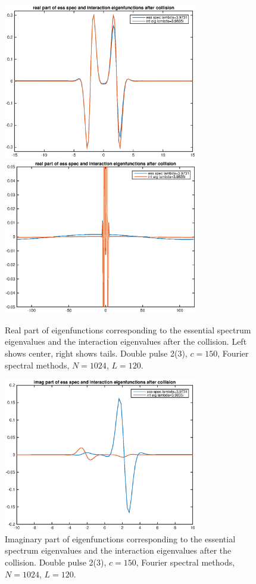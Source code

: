 \documentclass[12pt]{article}
\begin{document}
\begin{figure}[H]
	\includegraphics[width=8.5cm]{eigaftercollision1.eps}
	\includegraphics[width=8.5cm]{eigaftercollision2.eps}
	\caption{Real part of eigenfunctions corresponding to the essential spectrum eigenvalues and the interaction eigenvalues after the collision. Left shows center, right shows tails. Double pulse 2(3), $c = 150$, Fourier spectral methods, $N = 1024$, $L = 120$. }
\end{figure}

\begin{figure}[H]
	\includegraphics[width=8.5cm]{eigaftercollisionimag1.eps}
	\caption{Imaginary part of eigenfunctions corresponding to the essential spectrum eigenvalues and the interaction eigenvalues after the collision. Double pulse 2(3), $c = 150$, Fourier spectral methods, $N = 1024$, $L = 120$. }
\end{figure}
\end{document}
